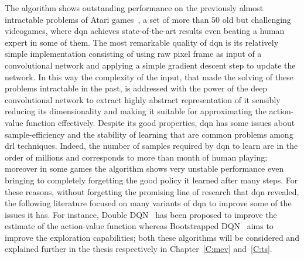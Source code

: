 The algorithm shows outstanding performance on the previously almost intractable problems of Atari games~\cite{bellemare2013arcade}, a set of more than $50$ old but challenging videogames, where \gls{dqn} achieves state-of-the-art results even beating a human expert in some of them. The most remarkable quality of \gls{dqn} is its relatively simple implementation consisting of using raw pixel frame as input of a convolutional network and applying a simple gradient descent step to update the network. In this way the complexity of the input, that made the solving of these problems intractable in the past, is addressed with the power of the deep convolutional network to extract highly abstract representation of it sensibly reducing its dimensionality and making it suitable for approximating the action-value function effectively. Despite its good properties, \gls{dqn} has some issues about sample-efficiency and the stability of learning that are common problems among \gls{drl} techniques. Indeed, the number of samples required by \gls{dqn} to learn are in the order of millions and corresponds to more than month of human playing; moreover in some games the algorithm shows very unstable performance even bringing to completely forgetting the good policy it learned after many steps. For these reasons, without forgetting the promising line of research that \gls{dqn} revealed, the following literature focused on many variants of \gls{dqn} to improve some of the issues it has. For instance, Double DQN~\cite{hasselt2015double} has been proposed to improve the estimate of the action-value function whereas Bootstrapped DQN~\cite{osband2017deep} aims to improve the exploration capabilities; both these algorithms will be considered and explained further in the thesis respectively in Chapter~\ref{C:mev} and~\ref{C:ts}.
